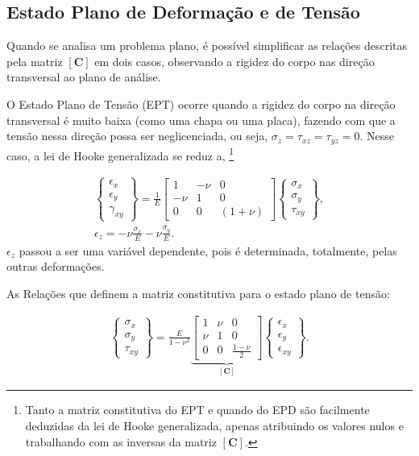 \subsection{Estado Plano de Deformação e de Tensão}

Quando se analisa um problema plano, é possível simplificar as relações descritas pela matriz $[\bm{C}]$ em dois casos, observando a rigidez do corpo nas direção transversal ao plano de análise.

O Estado Plano de Tensão (EPT) ocorre quando a rigidez do corpo na direção transversal é muito baixa (como uma chapa ou uma placa), fazendo com que a tensão nessa direção possa ser neglicenciada, ou seja, $\sigma_z = \tau_{xz} = \tau_{yz} = 0$. Nesse caso, a lei de Hooke generalizada se reduz a, \footnote{Tanto a matriz constitutiva do EPT e quando do EPD são facilmente deduzidas da lei de Hooke generalizada, apenas atribuindo os valores nulos e trabalhando com as inversas da matriz $[\bm{C}]$.}

\begin{gather}
    \begin{Bmatrix}
        \epsilon_x \\
        \epsilon_y \\
        \gamma_{xy}
    \end{Bmatrix} = \frac{1}{E} \begin{bmatrix}
        1 & -\nu & 0 \\
        -\nu & 1 & 0 \\
        0 & 0 & (1+\nu)
    \end{bmatrix}
    \begin{Bmatrix}
        \sigma_x \\
        \sigma_y \\
        \tau_{xy}
    \end{Bmatrix}, \\
    \epsilon_z = -\nu \frac{\sigma_x}{E} - \nu \frac{\sigma_y}{E}.
\end{gather}
$\epsilon_z$ passou a ser uma variável dependente, pois é determinada, totalmente, pelas outras deformações. \cite[pág. 90]{Zin}

As Relações que definem a matriz constitutiva para o estado plano de tensão:

\begin{gather}
    \begin{Bmatrix}
        \sigma_x \\
        \sigma_y \\
        \tau_{xy}
    \end{Bmatrix} = \frac{E}{1-\nu^2} 
    \underbrace{\begin{bmatrix}
        1 & \nu & 0 \\
        \nu & 1 & 0 \\
        0 & 0 & \frac{1-\nu}{2}
    \end{bmatrix}}_{[\bm{C}]}
    \begin{Bmatrix}
        \epsilon_x \\
        \epsilon_y \\
        \epsilon_{xy}
    \end{Bmatrix}.
\end{gather}

